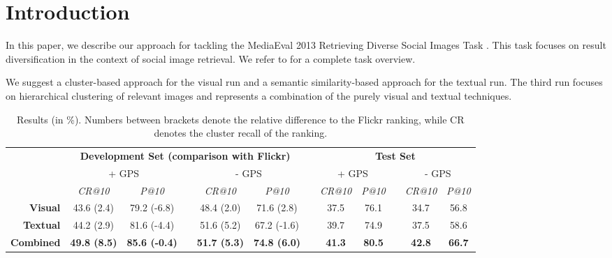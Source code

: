 \documentclass{acm_proc_article-me11_tweaked}
\begin{document}
\section{Introduction}
In this paper, we describe our approach for tackling the MediaEval 2013 Retrieving Diverse Social Images Task \cite{mediaeval-diversephotos}.
This task focuses on result diversification in the context of social image retrieval. We refer to \cite{mediaeval-diversephotos} for a complete task overview.

We suggest a cluster-based approach for the visual run and a semantic similarity-based approach for the textual run.
The third run focuses on hierarchical clustering of relevant images and represents a combination of the purely visual and textual techniques.



\begin{table*}[t]
\centering
\caption{Results (in \%). Numbers between brackets denote the relative difference to the Flickr ranking, while CR denotes the cluster recall of the ranking.}
 \begin{tabular}{|r|c|ccc|ccc|ccc|c|}
\cline{2-12}
   \multicolumn{1}{c|}{ } & \multicolumn{5}{c}{\bfseries Development Set (comparison with Flickr)}  & \vrule height2.75ex depth1.25ex width 1pt &  \multicolumn{5}{c|}{\bfseries Test Set} \\\cline{2-12}    
   \multicolumn{1}{c|}{ } & \multicolumn{2}{c}{ + GPS}  & \vrule height2.75ex depth1.25ex width 1pt & \multicolumn{2}{c}{ - GPS} & \vrule height2.75ex depth1.25ex width 1pt & \multicolumn{2}{c}{ + GPS}  & \vrule height2.75ex depth1.25ex width 1pt & \multicolumn{2}{c|}{ - GPS} \\\cline{2-12}
   \multicolumn{1}{c|}{ } &  \textit{CR@10} &   \textit{P@10} & \vrule height2.75ex depth1.25ex width 1pt &  \textit{CR@10} &  \textit{P@10} & \vrule height2.75ex depth1.25ex width 1pt &  \textit{CR@10} &   \textit{P@10} & \vrule height2.75ex depth1.25ex width 1pt &   \textit{CR@10} & \textit{P@10} \\
   \hline
   \bfseries Visual   & 43.6  (2.4) & 79.2 (-6.8) & \vrule height2.75ex depth1.25ex width 1pt & 48.4 (2.0)&  71.6 (2.8)& \vrule height2.75ex depth1.25ex width 1pt & 37.5 & 76.1 & \vrule height2.75ex depth1.25ex width 1pt & 34.7 & 56.8\\\hline
  \bfseries Textual  &  44.2  (2.9)  & 81.6 (-4.4) & \vrule height2.75ex depth1.25ex width 1pt & 51.6 (5.2) & 67.2 (-1.6)& \vrule height2.75ex depth1.25ex width 1pt &  39.7  & 74.9 & \vrule height2.75ex depth1.25ex width 1pt & 37.5 & 58.6\\\hline
  \bfseries Combined & \bfseries 49.8  (8.5) & \bfseries 85.6 (-0.4) & \vrule height2.75ex depth1.25ex width 1pt & \bfseries  51.7 (5.3)  & \bfseries 74.8  (6.0)& \vrule height2.75ex depth1.25ex width 1pt  & \bfseries 41.3 & \bfseries 80.5 & \vrule height2.75ex depth1.25ex width 1pt & \bfseries  42.8  & \bfseries 66.7 \\
    \hline
  \end{tabular}
  \label{tbl:results}  
\end{table*} 
\end{document}
